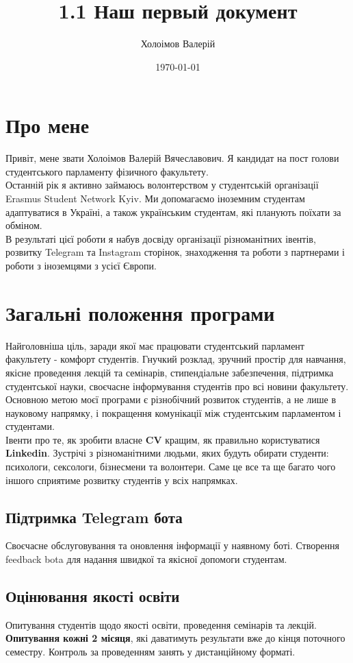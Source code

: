 \documentclass[a4paper,12pt]{article}
\author{Холоімов Валерій}
\title{1.1 Наш первый документ}
\date{\today}
\begin{document}
\section{Про мене}
Привіт, мене звати Холоімов Валерій Вячеславович. Я кандидат на пост голови студентського парламенту фізичного факультету. \\
\hspace*{17mm}Останній рік я активно займаюсь волонтерством у студентській організації Erasmus Student Network Kyiv. Ми допомагаємо іноземним студентам адаптуватися в Україні, а також українським студентам, які планують поїхати за обміном.\\
\hspace*{17mm}В результаті цієї роботи я набув досвіду організації різноманітних івентів, розвитку Telegram та Instagram сторінок, знаходження та роботи з партнерами і роботи з іноземцями з усієї Європи.

\section{Загальні положення програми}
Найголовніша ціль, заради якої має працювати студентський парламент факультету - комфорт студентів. Гнучкий розклад, зручний простір для навчання, якісне проведення лекцій та семінарів, стипендіальне забезпечення, підтримка студентської науки, своєчасне інформування студентів про всі новини факультету.\\
\hspace*{17mm}Основною метою моєї програми є різнобічний розвиток студентів, а не лише в науковому напрямку, і покращення комунікації між студентським парламентом і студентами.\\ \hspace*{17mm}Івенти про те, як зробити власне \textbf{CV} кращим, як правильно користуватися \textbf{Linkedin}. Зустрічі з різноманітними людьми, яких будуть обирати студенти: психологи, сексологи, бізнесмени та волонтери. Саме це все та ще багато чого іншого сприятиме розвитку студентів у всіх напрямках.
\subsection{Підтримка Telegram бота}
Своєчасне обслуговування та  оновлення інформації у наявному боті. Створення feedback bota для надання швидкої та якісної допомоги студентам.
\subsection{Оцінювання якості освіти}
Опитування студентів щодо якості освіти, проведення семінарів та лекцій.\\ \textbf{Опитування кожні 2 місяця}, які даватимуть результати вже до кінця поточного семестру. Контроль за проведенням занять у дистанційному форматі.
\end{document}
